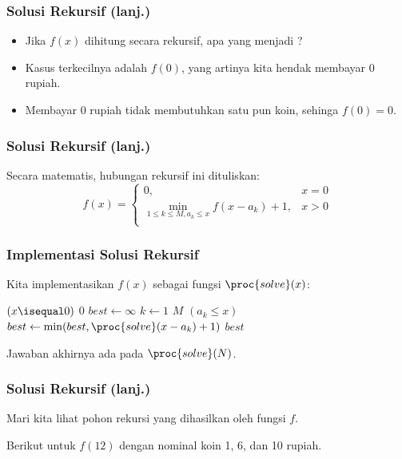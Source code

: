 \begin{frame}
\frametitle{Solusi Rekursif (lanj.)}
\begin{itemize}
  \item Jika $f(x)$ dihitung secara rekursif, apa yang menjadi \newTerm{\fbasecase}?
  \item Kasus terkecilnya adalah $f(0)$, yang artinya kita hendak membayar 0 rupiah.
  \item Membayar 0 rupiah tidak membutuhkan satu pun koin, sehinga $f(0) = 0$.
\end{itemize}
\end{frame}

\begin{frame}
\frametitle{Solusi Rekursif (lanj.)}
Secara matematis, hubungan rekursif ini dituliskan:
\[f(x) = \left\{\begin{array}{lr}
    0, & x = 0\\
    \min_{1 \leq k \leq M, a_k \leq x} {f(x - a_k) + 1}, & x > 0\\
    \end{array}\right. \]
\end{frame}

\begin{frame}
\frametitle{Implementasi Solusi Rekursif}
Kita implementasikan $f(x)$ sebagai fungsi $\proc{solve}(x)$:
\begin{codebox}
\li \If $(x \isequal 0)$ \Then
\li   \Return $0$
\li \End
\li $best \gets \infty$
\li \For $k \gets 1$ \To $M$ \Do
\li   \If $(a_k \leq x)$ \Then
\li     $best \gets \min(best, \proc{solve}(x - a_k) + 1)$
      \End
    \End
\li   \Return $best$
\end{codebox}

Jawaban akhirnya ada pada $\proc{solve}(N)$.
\end{frame}

\begin{frame} [fragile]
\frametitle{Solusi Rekursif (lanj.)}
Mari kita lihat pohon rekursi yang dihasilkan oleh fungsi $f$. 

Berikut untuk $f(12)$ dengan nominal koin 1, 6, dan 10 rupiah.

\begin{center}
\scalebox{0.9}{
\Tree [.$f(12)$
  [.$f(2)$
    [.$f(1)$
      [.$f(0)$ ]
    ]
  ]
  [.$f(6)$
    [.$f(0)$ ]
    [.$f(5)$
      [.$f(4)$
        [.$...$
        ]
      ]
    ]
  ]
  [.$f(11)$
    [.$f(1)$
      [.$f(0)$ ]
    ]
    [.$f(5)$
      [.$f(4)$
        [.$...$          
        ]
      ]
    ]
    [.$f(10)$ 
      [.$f(0)$ 
        [.$...$ ]      
      ]
      [.$f(4)$ 
        [.$...$ ]      
      ]
      [.$f(9)$ 
        [.$...$ ]      
      ]
    ]
  ]
]
}
\end{center}
\end{frame}

